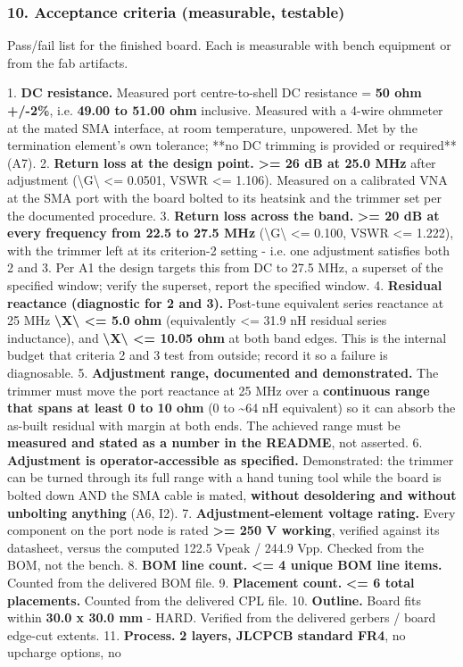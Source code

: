 \documentclass[11pt,a4paper]{article}
\begin{document}
\subsubsection*{10. Acceptance criteria (measurable, testable)}
Pass/fail list for the finished board. Each is measurable with bench equipment or from the fab artifacts.

1. \textbf{DC resistance.} Measured port centre-to-shell DC resistance = \textbf{50 ohm +/-2\%}, i.e. \textbf{49.00 to 51.00 ohm} inclusive. Measured with a 4-wire ohmmeter at the mated SMA interface, at room temperature, unpowered. Met by the termination element's own tolerance; {*}{*}no DC trimming is provided or required{*}{*} (A7). 2. \textbf{Return loss at the design point.} \textbf{\textgreater{}= 26 dB at 25.0 MHz} after adjustment (\textbackslash{}\textbar{}G\textbackslash{}\textbar{} \textless{}= 0.0501, VSWR \textless{}= 1.106). Measured on a calibrated VNA at the SMA port with the board bolted to its heatsink and the trimmer set per the documented procedure. 3. \textbf{Return loss across the band.} \textbf{\textgreater{}= 20 dB at every frequency from 22.5 to 27.5 MHz} (\textbackslash{}\textbar{}G\textbackslash{}\textbar{} \textless{}= 0.100, VSWR \textless{}= 1.222), with the trimmer left at its criterion-2 setting - i.e. one adjustment satisfies both 2 and 3. Per A1 the design targets this from DC to 27.5 MHz, a superset of the specified window; verify the superset, report the specified window. 4. \textbf{Residual reactance (diagnostic for 2 and 3).} Post-tune equivalent series reactance at 25 MHz \textbf{\textbackslash{}\textbar{}X\textbackslash{}\textbar{} \textless{}= 5.0 ohm} (equivalently \textless{}= 31.9 nH residual series inductance), and \textbf{\textbackslash{}\textbar{}X\textbackslash{}\textbar{} \textless{}= 10.05 ohm} at both band edges. This is the internal budget that criteria 2 and 3 test from outside; record it so a failure is diagnosable. 5. \textbf{Adjustment range, documented and demonstrated.} The trimmer must move the port reactance at 25 MHz over a \textbf{continuous range that spans at least 0 to 10 ohm} (0 to \textasciitilde{}64 nH equivalent) so it can absorb the as-built residual with margin at both ends. The achieved range must be \textbf{measured and stated as a number in the README}, not asserted. 6. \textbf{Adjustment is operator-accessible as specified.} Demonstrated: the trimmer can be turned through its full range with a hand tuning tool while the board is bolted down AND the SMA cable is mated, \textbf{without desoldering and without unbolting anything} (A6, I2). 7. \textbf{Adjustment-element voltage rating.} Every component on the port node is rated \textbf{\textgreater{}= 250 V working}, verified against its datasheet, versus the computed 122.5 Vpeak / 244.9 Vpp. Checked from the BOM, not the bench. 8. \textbf{BOM line count.} \textbf{\textless{}= 4 unique BOM line items.} Counted from the delivered BOM file. 9. \textbf{Placement count.} \textbf{\textless{}= 6 total placements.} Counted from the delivered CPL file. 10. \textbf{Outline.} Board fits within \textbf{30.0 x 30.0 mm} - HARD. Verified from the delivered gerbers / board edge-cut extents. 11. \textbf{Process.} \textbf{2 layers, JLCPCB standard FR4}, no upcharge options, no 
\end{document}
